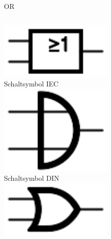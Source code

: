 \begin{frame}{OR}
  \begin{columns}
    \includegraphics[width=\textwidth,height=.2\textheight,keepaspectratio]{a14/OR_IEC.pdf}\\
    {\small Schaltsymbol IEC}\\
    \includegraphics[width=\textwidth,height=.2\textheight,keepaspectratio]{a14/OR_DIN.pdf}\\
    {\small Schaltsymbol DIN}\\
    \includegraphics[width=\textwidth,height=.2\textheight,keepaspectratio]{a14/OR_ANSI.pdf}\\

\end{columns}
\end{frame}
